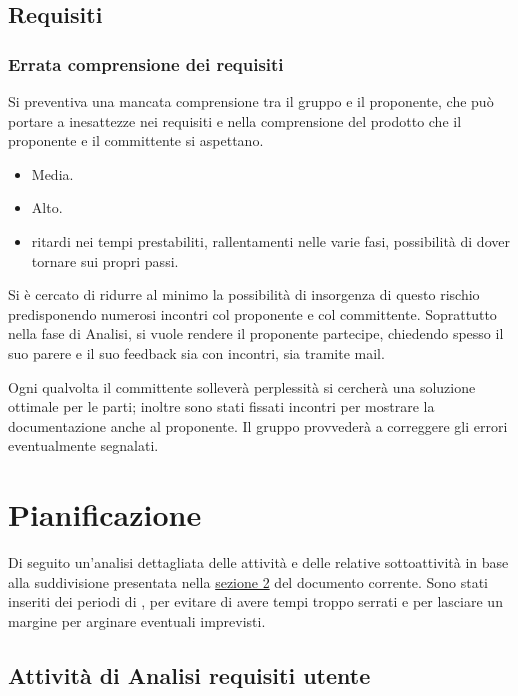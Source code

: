 \documentclass[a4paper, titlepage]{article}
\begin{document}
\subsection{Requisiti}
\subsubsection{Errata comprensione dei requisiti}
 Si preventiva una mancata comprensione tra il gruppo e il proponente, che può portare a inesattezze nei requisiti e nella comprensione del prodotto che il proponente e il committente si aspettano.
 
	\begin{itemize}
		\item {} Media.
		\item {} Alto.
		\item {} ritardi nei tempi prestabiliti, rallentamenti nelle varie fasi, possibilità di dover tornare sui propri passi.
	\end{itemize}
	
\label{Pianificazione}
 Si è cercato di ridurre al minimo la possibilità di insorgenza di questo rischio predisponendo numerosi incontri col proponente e col committente. Soprattutto nella fase di Analisi, si vuole rendere il proponente partecipe, chiedendo spesso il suo parere e il suo feedback sia con incontri, sia tramite mail.

 Ogni qualvolta il committente solleverà perplessità si cercherà una soluzione ottimale per le parti; inoltre sono stati fissati incontri per mostrare la documentazione anche al proponente. Il gruppo provvederà a correggere gli errori eventualmente segnalati.

\section {Pianificazione}
Di seguito un'analisi dettagliata delle attività e delle relative sottoattività in base alla suddivisione presentata nella \hyperref[Ciclo di vita]{sezione 2} del documento corrente.
Sono stati inseriti dei periodi di , per evitare di avere tempi troppo serrati e per lasciare un margine per arginare eventuali imprevisti.

\subsection{Attività  di Analisi requisiti utente}
\end{document}
